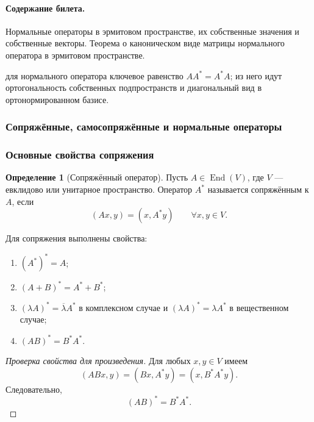 \documentclass[12pt,a4paper]{article}
\theoremstyle{definition}
\newtheorem{definition}{Определение}[section]
\theoremstyle{plain}
\theoremstyle{remark}
\newenvironment{planadd}{\begin{planbox}}{\end{planbox}}
\newcommand{\End}{\operatorname{End}}
\begin{document}
\paragraph{Содержание билета.} Нормальные операторы в эрмитовом пространстве, их собственные значения и собственные векторы. Теорема о каноническом виде матрицы нормального оператора в эрмитовом пространстве.

\begin{planadd}

для нормального оператора ключевое равенство $AA^*=A^*A$; из него идут ортогональность собственных подпространств и диагональный вид в ортонормированном базисе.

\end{planadd}

\subsubsection{Сопряжённые, самосопряжённые и нормальные операторы}

\subsubsection*{Основные свойства сопряжения}

\begin{definition}[Сопряжённый оператор]
Пусть $A\in\End(V)$, где $V$ --- евклидово или унитарное пространство.
Оператор $A^*$ называется сопряжённым к $A$, если
\[
    (Ax,y)=(x,A^*y)
    \qquad \forall x,y\in V.
\]
\end{definition}

Для сопряжения выполнены свойства:
\begin{enumerate}[label=\arabic*)]
    \item $(A^*)^*=A$;
    \item $(A+B)^*=A^*+B^*$;
    \item $(\lambda A)^*=\overline{\lambda}A^*$ в комплексном случае и $(\lambda A)^*=\lambda A^*$ в вещественном случае;
    \item $(AB)^*=B^*A^*$.
\end{enumerate}

\begin{proof}[Проверка свойства для произведения]
Для любых $x,y\in V$ имеем
\[
    (ABx,y)=(Bx,A^*y)=(x,B^*A^*y).
\]
Следовательно,
\[
    (AB)^*=B^*A^*.
\]
\end{proof}
\end{document}
